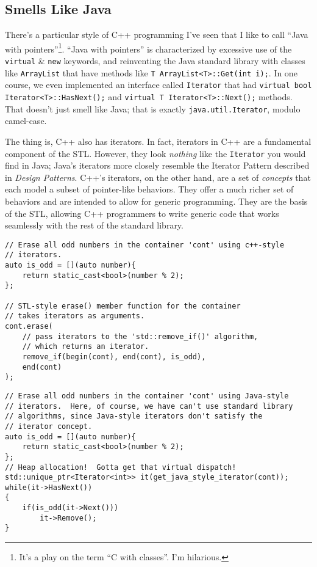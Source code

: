 \documentclass{article}
\begin{document}
\subsection*{Smells Like Java}
There's a particular style of C++ programming I've seen that I like to call ``Java with pointers''\footnote{It's a play on the term ``C with classes''.  I'm hilarious.}.  ``Java with pointers'' is characterized by excessive use of the \lstinline{virtual} \& \lstinline{new} keywords, and reinventing the Java standard library with classes like \lstinline{ArrayList} that have methods like \lstinline{T ArrayList<T>::Get(int i);}.  In one course, we even implemented an interface called \lstinline{Iterator} that had \lstinline{virtual bool Iterator<T>::HasNext();} and \lstinline{virtual T Iterator<T>::Next();} methods.  That doesn't just smell like Java; that is exactly \texttt{java.util.Iterator}, modulo camel-case.

The thing is, C++ also has iterators.  In fact, iterators in C++ are a fundamental component of the STL.  However, they look \emph{nothing} like the \lstinline{Iterator} you would find in Java; Java's iterators more closely resemble the Iterator Pattern described in \textit{Design Patterns}.  C++'s iterators, on the other hand, are a set of \emph{concepts} that each model a subset of pointer-like behaviors.  They offer a much richer set of behaviors and are intended to allow for generic programming.  They are the basis of the STL, allowing C++ programmers to write generic code that works seamlessly with the rest of the standard library.

\begin{lstlisting}
// Erase all odd numbers in the container 'cont' using c++-style 
// iterators.
auto is_odd = [](auto number){
	return static_cast<bool>(number % 2);
};

// STL-style erase() member function for the container 
// takes iterators as arguments.
cont.erase(
	// pass iterators to the 'std::remove_if()' algorithm, 
	// which returns an iterator.
	remove_if(begin(cont), end(cont), is_odd), 
	end(cont)
);
\end{lstlisting}

\begin{lstlisting}
// Erase all odd numbers in the container 'cont' using Java-style
// iterators.  Here, of course, we have can't use standard library
// algorithms, since Java-style iterators don't satisfy the 
// iterator concept.
auto is_odd = [](auto number){
	return static_cast<bool>(number % 2);
};
// Heap allocation!  Gotta get that virtual dispatch!
std::unique_ptr<Iterator<int>> it(get_java_style_iterator(cont));
while(it->HasNext())
{
	if(is_odd(it->Next()))
		it->Remove();
}
\end{lstlisting}
\end{document}
